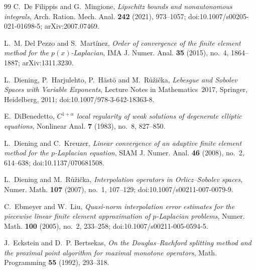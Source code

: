 \documentclass[11pt]{amsart}
\theoremstyle{definition}
\theoremstyle{remark}
\numberwithin{equation}{section}
\begin{document}
\begin{thebibliography}{99}
C.~De Filippis and G.~Mingione, \emph{Lipschitz bounds and nonautonomous integrals}, Arch. Ration. Mech. Anal. \textbf{242} (2021), 973--1057; doi:10.1007/s00205-021-01698-5; arXiv:2007.07469.

L.~M. Del Pezzo and S.~Mart\'inez, \emph{Order of convergence of the finite element method for the $p(x)$-Laplacian}, IMA J. Numer. Anal. \textbf{35} (2015), no.~4, 1864--1887; arXiv:1311.3230.

L.~Diening, P.~Harjulehto, P.~H\"ast\"o and M.~R\r{u}\v{z}i\v{c}ka, \emph{Lebesgue and Sobolev Spaces with Variable Exponents}, Lecture Notes in Mathematics~2017, Springer, Heidelberg, 2011; doi:10.1007/978-3-642-18363-8.

E.~DiBenedetto, \emph{$C^{1+\alpha}$ local regularity of weak solutions of degenerate elliptic equations}, Nonlinear Anal. \textbf{7} (1983), no.~8, 827--850.

L.~Diening and C.~Kreuzer, \emph{Linear convergence of an adaptive finite element method for the $p$-Laplacian equation}, SIAM J. Numer. Anal. \textbf{46} (2008), no.~2, 614--638; doi:10.1137/070681508.

L.~Diening and M.~R\r{u}\v{z}i\v{c}ka, \emph{Interpolation operators in Orlicz--Sobolev spaces}, Numer. Math. \textbf{107} (2007), no.~1, 107--129; doi:10.1007/s00211-007-0079-9.

C.~Ebmeyer and W.~Liu, \emph{Quasi-norm interpolation error estimates for the piecewise linear finite element approximation of $p$-Laplacian problems}, Numer. Math. \textbf{100} (2005), no.~2, 233--258; doi:10.1007/s00211-005-0594-5.

J.~Eckstein and D.~P. Bertsekas, \emph{On the Douglas--Rachford splitting method and the proximal point algorithm for maximal monotone operators}, Math. Programming \textbf{55} (1992), 293--318.


\end{thebibliography}
\end{document}
